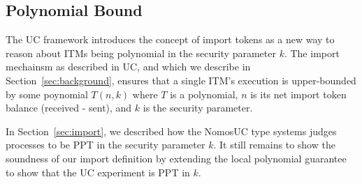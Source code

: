 
\subsection{Polynomial Bound}
The UC framework introduces the concept of import tokens as a new way to reason about ITMs being polynomial in the security parameter $k$. 
The import mechainsm as described in UC, and which we describe in Section~\ref{sec:background}, ensures that a single ITM's execution is upper-bounded by some poynomial $T(n,k)$ where $T$ is a polynomial, $n$ is its net import token balance (received - sent), and $k$ is the security parameter.

In Section~\ref{sec:import}, we described how the NomosUC type systems judges processes to be PPT in the security parameter $k$. 
It still remains to show the soundness of our import definition by extending the local polynomial guarantee to show that the UC experiment is PPT in $k$.

